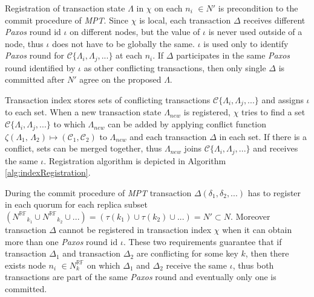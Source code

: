 \documentclass[runningheads,a4paper]{llncs}
\newcommand{\nodesTx}{$\mathit{N'}$\xspace}
\newcommand{\transaction}{$\Delta$\xspace}
\newcommand{\txOne}{$\Delta_{1}$\xspace}
\newcommand{\txTwo}{$\Delta_{2}$\xspace}
\newcommand{\txStateM}{$\Lambda_{new}$\xspace}
\newcommand{\txStates}{$\{\Lambda_{i}, \Lambda_{j}, ...\}$\xspace}
\newcommand{\conflictFunction}{$\zeta (\text{\txStateOne, \txStateTwo}) \mapsto ( \mathcal{C}_1, \mathcal{C}_2)$\xspace}
\newcommand{\conflictingTxSet}{$\mathcal{C}\text{\txStates}$\xspace}
\newcommand{\NRF}{\mathit{N^{\mathbb{RF}}}}
\newcommand{\paxosRoundId}{$\iota$\xspace}
\newcommand{\transactionFull}{$\Delta(\delta_{1}, \delta_{2}, ...)$\xspace}
\newcommand{\txState}{$\Lambda$\xspace}
\newcommand{\txStateOne}{$\Lambda_1$\xspace}
\newcommand{\txStateTwo}{$\Lambda_2$\xspace}
\newcommand{\txIndex}{$\chi$\xspace}
\newcommand{\paxos}{\emph{Paxos}\xspace}
\newcommand{\mpt}{\emph{MPT}\xspace}
\newcommand{\RFaloneInMath}{\mathbb{RF}}
\newcommand{\node}[1]{$n_{#1}$\xspace}
\begin{document}
Registration of transaction state \txState in \txIndex on each \node{i} $\in$\nodesTx is precondition to the commit procedure of \mpt. 
Since \txIndex is local, each transaction \transaction receives different \paxos round id \paxosRoundId on different nodes, but the value of \paxosRoundId is never used outside of a node, thus \paxosRoundId does not have to be globally the same. \paxosRoundId is used only to identify \paxos round for \conflictingTxSet at each \node{i}. If \transaction participates in the same \paxos round identified by \paxosRoundId as other conflicting transactions, then only single \transaction is committed after \nodesTx agree on the proposed \txState.


Transaction index stores sets of conflicting transactions \conflictingTxSet and assigns \paxosRoundId to each set. When a new transaction state \txStateM is registered, \txIndex tries to find a set \conflictingTxSet to which \txStateM can be added by applying conflict function \conflictFunction to \txStateM and each transaction \transaction in each set. If there is a conflict, sets can be merged together, thus \txStateM joins \conflictingTxSet and receives the same \paxosRoundId. Registration algorithm is depicted in Algorithm \ref{alg:indexRegistration}.

During the commit procedure of \mpt transaction \transactionFull has to register in each quorum for each replica subset
$(\NRF_{k_1} \cup \NRF_{k_2} \cup ... ) =
(\tau(k_1) \cup \tau(k_2) \cup ... ) = 
 \text{\nodesTx}\subset\mathit{N}$.
Moreover transaction \transaction cannot be registered in transaction index \txIndex when it can obtain more than one \paxos round id \paxosRoundId. These two requirements guarantee that if transaction \txOne and transaction \txTwo are conflicting for some key $k$, then there exists node \node{i}
$\in N^{\RFaloneInMath}_{k}$ on which \txOne and \txTwo receive the same \paxosRoundId, thus both transactions are part of the same \paxos round and eventually only one is committed.

\end{document}
